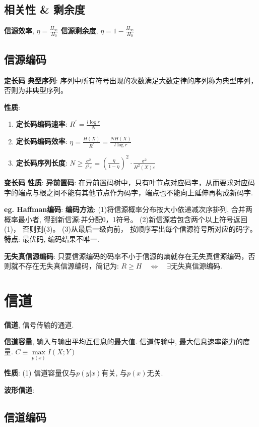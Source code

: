 \documentclass{article}
\newcommand{\env}[2]{\begin{#1}#2\end{#1}}
\newcommand{\defi}[2]{\textbf{#1}, #2}
\begin{document}
    \subsection{相关性 \& 剩余度}
        \defi{信源效率}{$\eta = \frac{H_\infty}{H_0}$}
        \defi{信源剩余度}{$\eta = 1 - \frac{H_\infty}{H_0}$}
            
    \subsection{信源编码}
        \textbf{定长码}
            \textbf{典型序列}: 序列中所有符号出现的次数满足大数定律的序列称为典型序列，否则为非典型序列。

            \textbf{性质}:
                \env{enumerate}{
                \item \textbf{定长码编码速率}: $R^{\prime}=\frac{l \log r}{N}$
                \item \textbf{定长码编码效率}: $\eta=\frac{H(X)}{R^{\prime}}=\frac{N H(X)}{l \log r}$
                \item \textbf{定长码序列长度}: $N \geqslant \frac{\sigma^{2}}{\delta^{2} \varepsilon}=\left(\frac{\eta}{1-\eta}\right)^{2} \cdot \frac{\sigma^{2}}{H^{2}(X) \varepsilon}$
                }


        \textbf{变长码}  
            \textbf{性质}:
                \textbf{异前置码}: 在异前置码树中，只有叶节点对应码字，从而要求对应码字的端点与根之间不能有其他节点作为码字，端点也不能向上延伸再构成新码字.
                

            \textbf{eg. Haffman编码}:
                \textbf{编码方法}:
                    (1)将信源概率分布按大小依递减次序排列, 合并两概率最小者, 得到新信源:并分配0，1符号。
                    (2)新信源若包含两个以上符号返回(1)， 否则到(3)。
                    (3)从最后一级向前， 按顺序写出每个信源符号所对应的码字。
                \textbf{特点}:
                    最优码, 编码结果不唯一.
                    
        \textbf{无失真信源编码}: 只要信源编码的码率不小于信源的熵就存在无失真信源编码，否则就不存在无失真信源编码，简记为: $ R \ge H \quad \Leftrightarrow  \quad \exists \text{无失真信源编码}$.
        

\section{信道}
    \defi{信道}{信号传输的通道.}

    \defi{信道容量}{输入与输出平均互信息的最大值. 信道传输中, 最大信息速率能力的度量. $C \equiv \max\limits_{p(x)} I(X ; Y)$}
    
        \textbf{性质}:
            (1) 信道容量仅与$p(y|x)$有关, 与$p(x)$无关.

    \textbf{波形信道}: 

    \subsection{信道编码}
        
\end{document}
